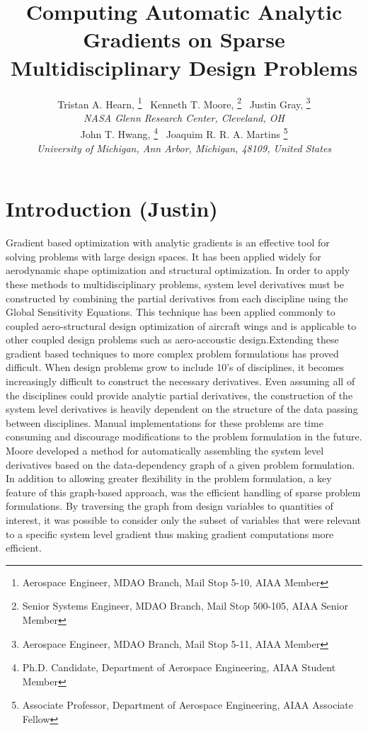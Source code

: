 \documentclass[]{aiaa-tc} %
\title{Computing Automatic Analytic Gradients on Sparse Multidisciplinary Design Problems }
\author{
  Tristan A. Hearn,%
     \thanks{Aerospace Engineer, MDAO Branch, Mail Stop 5-10, AIAA Member}
  \ Kenneth T. Moore,%
     \thanks{Senior Systems Engineer, MDAO Branch, Mail Stop 500-105, AIAA Senior Member}
  \ Justin Gray,%
     \thanks{Aerospace Engineer, MDAO Branch, Mail Stop 5-11, AIAA Member}
   \\
  {\normalsize\itshape
  NASA Glenn Research Center, Cleveland, OH}  \\
  John T. Hwang,%
  \thanks{Ph.D. Candidate, Department of Aerospace Engineering, AIAA Student Member}
  \ Joaquim R. R. A. Martins%
  \thanks{Associate Professor, Department of Aerospace Engineering, AIAA Associate Fellow}
  \\
  {\normalsize\itshape
   University of Michigan, Ann Arbor, Michigan, 48109, United States}
}
\begin{document}
  \maketitle

  \begin{abstract}

  \end{abstract}

  \section{Introduction (Justin)}

    Gradient based optimization with analytic gradients is an effective tool for solving problems
    with large design spaces. It has been applied widely for aerodynamic shape optimization \cite{Liou2010,palacios2012adjoint}
    and structural optimization\cite{venkataraman2004structural, }.
    In order to apply these methods to multidisciplinary problems, system level derivatives must be
    constructed by combining the partial derivatives from each discipline using the Global Sensitivity
    Equations\cite{Sobieski1990}. This technique has been applied commonly to coupled
    aero-structural design optimization of aircraft wings\cite{Kenway2012c, Haghighat2012} and is applicable to
    other coupled design problems such as aero-accoustic design\cite{economon2012coupled}.Extending these
    gradient based techniques to more complex problem formulations has proved difficult. When
    design problems grow to include 10's of disciplines, it becomes increasingly difficult to construct the
    necessary derivatives. Even assuming all of the disciplines could provide analytic partial derivatives,
    the construction of the system level derivatives is heavily dependent on the structure of the data passing
    between disciplines. Manual implementations for these problems are time consuming and discourage modifications
    to the problem formulation in the future. Moore developed a method for automatically assembling the system
    level derivatives based on the data-dependency graph of a given problem formulation\cite{openmdao_derivatives}.
    In addition to allowing greater flexibility in the problem formulation, a key feature of this graph-based approach, was the efficient
    handling of sparse problem formulations. By traversing the graph from design variables to quantities of interest,
    it was possible to consider only the subset of variables that were relevant to a specific system level gradient thus
    making gradient computations more efficient.
\end{document}
